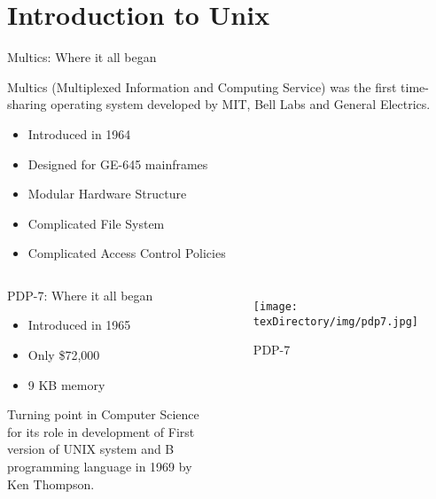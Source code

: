 \documentclass[compress]{beamer}
\begin{document}
\prepareCover

\section{Introduction to Unix}

\begin{slide}
	\begin{block}{Multics: Where it all began}

	Multics (Multiplexed Information and Computing Service) was the first time-sharing operating system developed by MIT, Bell Labs and General Electrics.

	\begin{itemize}
	\item[] Introduced in 1964
	\item[] Designed for GE-645 mainframes
	\item[] Modular Hardware Structure
	\item[] Complicated File System
	\item[] Complicated Access Control Policies
	\end{itemize}

	\end{block}
\end{slide}

\begin{slide}
	\begin{columns}

	\begin{block}{PDP-7: Where it all began}

	\begin{itemize}
	\item[] Introduced in 1965
	\item[] Only \$72,000
	\item[] 9 KB memory
	\end{itemize}

	Turning point in Computer Science for its role in development of First version of UNIX system and B programming language in 1969 by Ken Thompson.

	\end{block}

	\begin{figure}
	\texttt{[image: \\texDirectory/img/pdp7.jpg]}
	\caption{PDP-7}
	\end{figure}

	\end{columns}
\end{slide}
\end{document}

